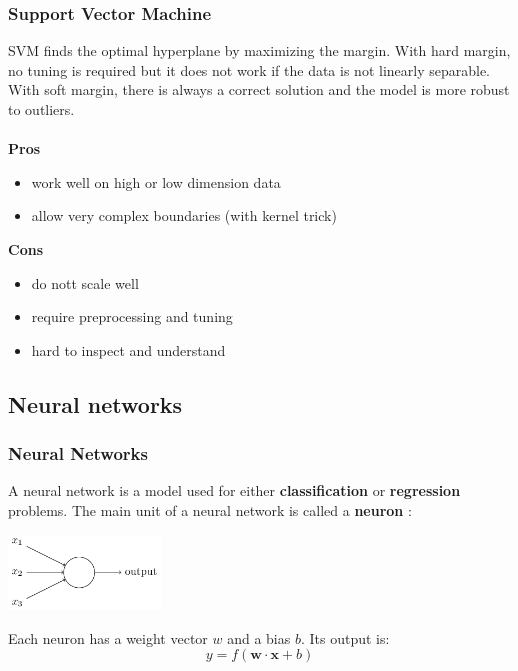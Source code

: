 \documentclass{beamer}
\begin{document}
\begin{frame}
  \frametitle{Support Vector Machine}
  SVM finds the optimal hyperplane by maximizing the margin. With hard margin,
  no tuning is required but it does not work if the data is not linearly
  separable. With soft margin, there is always a correct solution and the model
  is more robust to outliers.
  \\~\\
  \textbf{Pros}
  \begin{itemize}
    \item work well on high or low dimension data
    \item allow very complex boundaries (with kernel trick)
  \end{itemize}

  \textbf{Cons}
  \begin{itemize}
    \item do nott scale well
    \item require preprocessing and tuning
    \item hard to inspect and understand
  \end{itemize}
\end{frame}

\subsection{Neural networks}
\begin{frame}
  \frametitle{Neural Networks}
  A neural network is a model used for either \textbf{classification} or
  \textbf{regression} problems. The main unit of a neural network is called a
  \textbf{neuron} :

  \begin{center}
    \includegraphics[height=2cm]{img/neuron.png}
  \end{center}

  Each neuron has a weight vector $w$ and a bias $b$. Its output is:
  \begin{equation}
    y = f(\boldsymbol{w} \cdot \boldsymbol{x} + b)
  \end{equation}
\end{frame}
\end{document}
